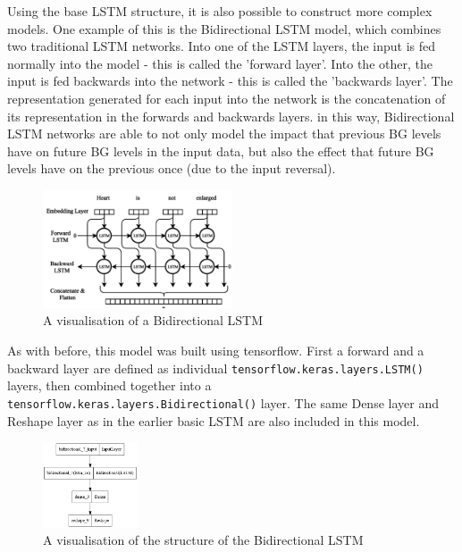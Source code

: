       Using the base LSTM structure, it is also possible to construct more complex models. One example of this is the Bidirectional LSTM model, which combines two traditional LSTM networks. Into one of the LSTM layers, the input is fed normally into the model - this is called the 'forward layer'. Into the other, the input is fed backwards into the network - this is called the 'backwards layer'. The representation generated for each input into the network is the concatenation of its representation in the forwards and backwards layers. in this way, Bidirectional LSTM networks are able to not only model the impact that previous BG levels have on future BG levels in the input data, but also the effect that future BG levels have on the previous once (due to the input reversal).

      \begin{figure}[H]
        \centering

        \includegraphics[width=0.5\textwidth]{images/BiLSTM.png}
        \caption{
         A visualisation of a Bidirectional LSTM \cite{bilstm}
        }
      \end{figure}

      As with before, this model was built using tensorflow. First a forward and a backward layer are defined as individual \Verb+tensorflow.keras.layers.LSTM()+ layers, then combined together into a \Verb+tensorflow.keras.layers.Bidirectional()+ layer. The same Dense layer and Reshape layer as in the earlier basic LSTM are also included in this model.

      \begin{figure}[H]
        \centering

        \includegraphics[width=0.25\textwidth]{images/BiDiagram.png}
        \caption{
         A visualisation of the structure of the Bidirectional LSTM
        }
      \end{figure}

